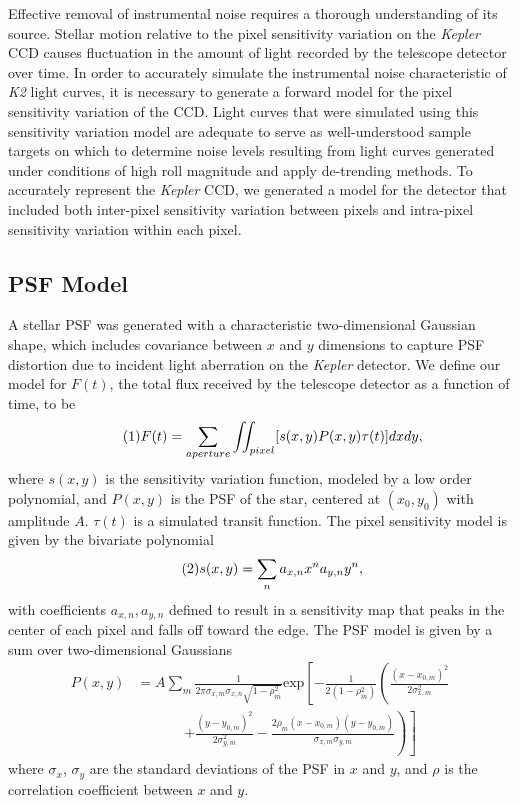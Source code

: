 \documentclass[12pt,preprint]{aastex}
\begin{document}
Effective removal of instrumental noise requires a thorough understanding of its source. Stellar motion relative to the pixel sensitivity variation on the \textit{Kepler} CCD causes fluctuation in the amount of light recorded by the telescope detector over time. In order to accurately simulate the instrumental noise characteristic of \textit{K2} light curves, it is necessary to generate a forward model for the pixel sensitivity variation of the CCD. Light curves that were simulated using this sensitivity variation model are adequate to serve as well-understood sample targets on which to determine noise levels resulting from light curves generated under conditions of high roll magnitude and apply de-trending methods. To accurately represent the \textit{Kepler} CCD, we generated a model for the detector that included both inter-pixel sensitivity variation between pixels and intra-pixel sensitivity variation within each pixel.

\subsection{PSF Model}

A stellar PSF was generated with a characteristic two-dimensional Gaussian shape, which includes covariance between $x$ and $y$ dimensions to capture PSF distortion due to incident light aberration on the \textit{Kepler} detector. We define our model for $F(t)$, the total flux received by the telescope detector as a function of time, to be
%
\[
\tag{1}
F(t)=\sum_{aperture} \iint_{pixel} [s(x,y)P(x,y)\tau (t)]dxdy,\\
\]
%
where $s(x,y)$ is the sensitivity variation function, modeled by a low order polynomial, and $P(x,y)$ is the PSF of the star, centered at $(x_0,y_0)$ with amplitude $A$. $\tau (t)$ is a simulated transit function. The pixel sensitivity model is given by the bivariate polynomial
%
\[
\tag{2}
s(x,y) = \sum_n a_{x,n}x^na_{y,n}y^n, \\
\]
%
with coefficients $a_{x,n}, a_{y,n}$ defined to result in a sensitivity map that peaks in the center of each pixel and falls off toward the edge. The PSF model is given by a sum over two-dimensional Gaussians
%
\[
\tag{3}
\begin{split}
P(x,y) & = A \sum_m \frac{1}{2\pi\sigma_{x,m}\sigma_{x,n}\sqrt{1-\rho_m^2}} \text{exp}\left[ -\frac{1}{2(1-\rho_m^2)} \left( \frac{(x-x_{0,m})^2}{2\sigma_{x,m}^2} \right. \right. \\
			 & \phantom{xxxxxx} \left. \left. + \frac{(y-y_{0,m})^2}{2\sigma_{y,m}^2} - \frac{2\rho_m  (x-x_{0,m})(y-y_{0,m})}{\sigma_{x,m}\sigma_{y,m}} \right) \right]
\end{split}
\]
%
where $\sigma_x$, $\sigma_y$ are the standard deviations of the PSF in $x$ and $y$, and $\rho$ is the correlation coefficient between $x$ and $y$.
\end{document}
